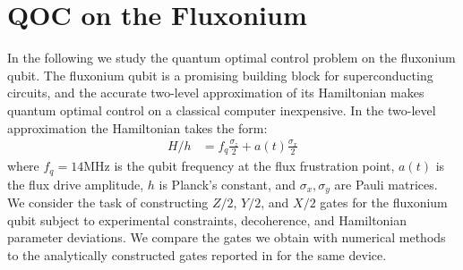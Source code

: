 \section{QOC on the Fluxonium \label{sec:fluxonium}}
In the following we study
the quantum optimal control problem on the fluxonium qubit.
The fluxonium qubit is a promising building block for superconducting
circuits, and the accurate
two-level approximation of its Hamiltonian makes
quantum optimal control on a classical computer inexpensive.
In the two-level
approximation the Hamiltonian takes the form:
\begin{align}
  H/h &= f_{q} \frac{\sigma_{z}}{2} + a(t) \frac{\sigma_{x}}{2}
  \label{eq:hamiltonian}
\end{align}
where $f_{q} = 14$MHz is the qubit frequency at the flux frustration point,
$a(t)$ is the flux drive amplitude, $h$ is Planck's constant, and $\sigma_{x}, \sigma_{y}$
are Pauli matrices. We consider the task of constructing $Z/2$, $Y/2$, and $X/2$
gates for the fluxonium qubit subject to experimental constraints, decoherence, and
Hamiltonian parameter deviations. We compare the gates we obtain with numerical
methods to the analytically constructed gates reported in
\cite{zhang2020universal} for the same device.

